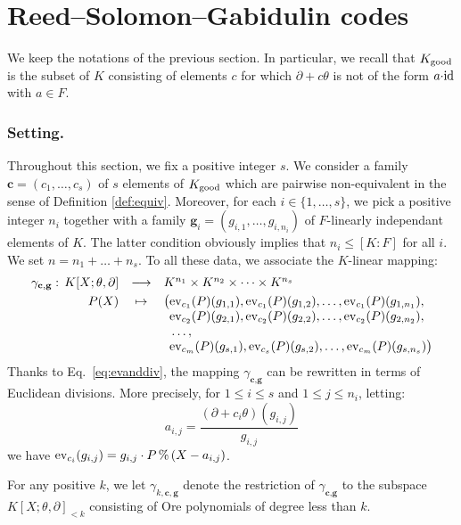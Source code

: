 \documentclass[a4paper]{llncs}
\newcommand{\id}{\textrm{\rm id}}
\newcommand{\ev}[1]{\textrm{\rm ev}_{#1}}
\renewcommand{\mod}{\,\%\,}
\newcommand{\bc}{\textbf{c}}
\newcommand{\bg}{\textbf{g}}
\newcommand{\good}{\textrm{\rm good}}
\begin{document}
\section{Reed--Solomon--Gabidulin codes}

We keep the notations of the previous section. In particular, we recall 
that $K_\good$ is the subset of $K$ consisting of elements $c$ for which 
$\partial + c\theta$ is not of the form $a{\cdot}\id$ with $a \in F$.

\subsubsection*{Setting.}

Throughout this section, we fix a positive integer $s$. We consider a 
family $\bc = (c_1, \ldots, c_s)$ of $s$ elements of $K_\good$ which are 
pairwise non-equivalent in the sense of Definition \ref{def:equiv}.
Moreover, for each $i \in \{1,\ldots,s\}$, we pick a positive integer
$n_i$ together with a family $\bg_i = (g_{i,1}, \ldots, g_{i,n_i})$ of 
$F$-linearly independant elements of $K$. The latter condition obviously
implies that $n_i \leq [K:F]$ for all $i$.
We set $n = n_1 + \ldots + n_s$.
To all these data, we associate the $K$-linear mapping:
$$\begin{array}{rcl}
\gamma_{\bc,\bg} : \, K[X;\theta,\partial] & \longrightarrow 
 & K^{n_1} \times K^{n_2} \times \cdots \times K^{n_s} \smallskip \\
P(X) & \mapsto 
 & \big(\ev{c_1}(P)(g_{1,1}), \ev{c_1}(P)(g_{1,2}), \ldots, \ev{c_1}(P)(g_{1,n_1}), \\
&& \phantom{\big(}\ev{c_2}(P)(g_{2,1}), \ev{c_2}(P)(g_{2,2}), \ldots, \ev{c_2}(P)(g_{2,n_2}), \\
&& \phantom{\big(}\ldots, \\
&& \phantom{\big(}\ev{c_m}(P)(g_{s,1}), \ev{c_s}(P)(g_{s,2}), \ldots, \ev{c_m}(P)(g_{s,n_s})\big)
\end{array}$$
Thanks to Eq.~\eqref{eq:evanddiv}, the mapping $\gamma_{\bc,\bg}$
can be rewritten in terms of Euclidean divisions. More precisely,
for $1 \leq i \leq s$ and $1 \leq j \leq n_i$, letting:
\begin{equation}
\label{eq:aij}
a_{i,j} = \frac{(\partial + c_i\theta)(g_{i,j})}{g_{i,j}}
\end{equation}
we have $\ev{c_i}(g_{i,j}) = g_{i,j} \cdot P \mod (X - a_{i,j})$.

For any positive $k$, we let $\gamma_{k,\bc,\bg}$ denote the 
restriction of $\gamma_{\bc,\bg}$ to the subspace 
$K[X;\theta,\partial]_{<k}$ consisting of Ore polynomials of
degree less than $k$.
\end{document}
